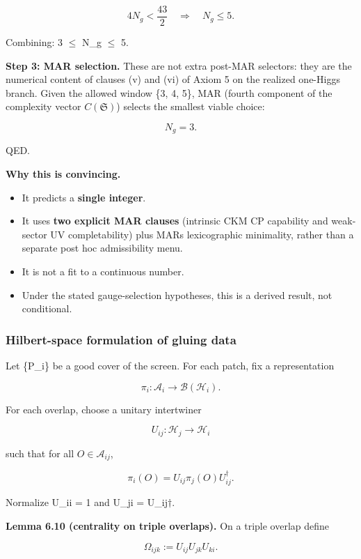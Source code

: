 \[
4 N_g < \frac{43}{2} \quad \Rightarrow \quad N_g \le 5.
\]

Combining: 3 \ensuremath{\leq} N\_g \ensuremath{\leq} 5.

\textbf{Step 3: MAR selection.} These are not extra post-MAR selectors: they are the numerical content of clauses (v) and (vi) of Axiom 5 on the realized one-Higgs branch. Given the allowed window \{3, 4, 5\}, MAR (fourth component of the complexity vector \(C(\mathfrak S)\)) selects the smallest viable choice:

\[
N_g = 3.
\]

QED.

\textbf{Why this is convincing.}

\begin{itemize}
\tightlist
\item
  It predicts a \textbf{single integer}.
\item
  It uses \textbf{two explicit MAR clauses} (intrinsic CKM CP capability and weak-sector UV completability) plus MAR\textquotesingle s lexicographic minimality, rather than a separate post hoc admissibility menu.
\item
  It is not a fit to a continuous number.
\item
  Under the stated gauge-selection hypotheses, this is a derived result, not conditional.
\end{itemize}

\subsubsection{Hilbert-space formulation of gluing data}\label{65-hilbert-space-formulation-of-gluing-data}

Let \{P\_i\} be a good cover of the screen. For each patch, fix a representation

\[
\pi_i: \mathcal{A}_i \to \mathcal B(\mathcal H_i).
\]

For each overlap, choose a unitary intertwiner

\[
U_{ij}: \mathcal H_j \to \mathcal H_i
\]

such that for all \(O \in \mathcal{A}_{ij}\),

\[
\pi_i(O) = U_{ij} \pi_j(O) U_{ij}^\dagger.
\]

Normalize U\_ii = 1 and U\_ji = U\_ij\ensuremath{\dagger}.

\textbf{Lemma 6.10 (centrality on triple overlaps).} On a triple overlap define

\[
\Omega_{ijk} := U_{ij} U_{jk} U_{ki}.
\]

